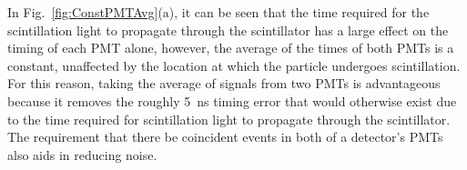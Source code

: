 \documentclass[%
 reprint,
 calc,
 amsmath,amssymb,
 aps,
 nofootinbib,
 linenumbers
]{revtex4-1}
\begin{document}
In Fig.~\ref{fig:ConstPMTAvg}(a), it can be seen that the time required for the scintillation light to propagate through the scintillator has a large effect on the timing of each PMT alone, however, the average of the times of both PMTs is a constant, unaffected by the location at which the particle undergoes scintillation.
For this reason, taking the average of signals from two PMTs is advantageous because it removes the roughly 5~ns timing error that would otherwise exist due to the time required for scintillation light to propagate through the scintillator.
The requirement that there be coincident events in both of a detector's PMTs also aids in reducing noise.
\begin{figure}[h]
\centering
{}


\end{figure}
\end{document}
